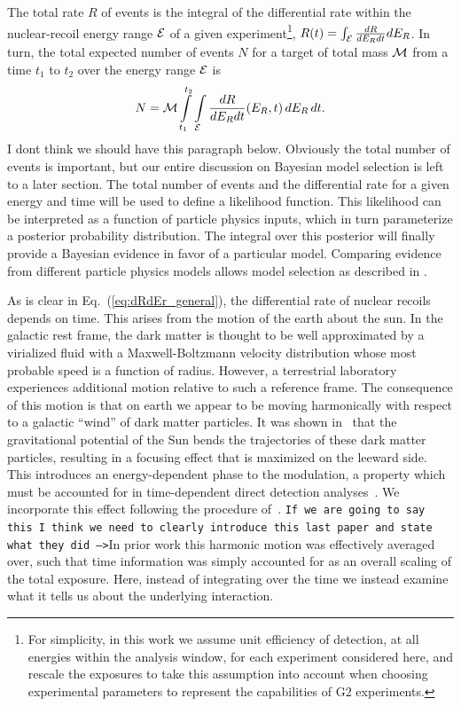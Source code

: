 \documentclass[11pt]{article}
\newcommand{\beq}{\begin{equation}} \newcommand{\eeq}{\end{equation}}
\newcommand{\Eq}[1]{Eq.~(\ref{#1})} \newcommand{\Eqs}[2]{Eqs.~(\ref{#1}) and (\ref{#2})} \newcommand{\Eqm}[2]{Eqs.~(\ref{#1}) through (\ref{#2})}
\newcommand{\sjwColor}{red}
\newcommand{\sjw}[1]{{\color{\sjwColor} #1}}
\newcommand{\sjwtt}[1]{{\color{\sjwColor}\tt #1}}
\begin{document}
The total rate $R$ of events is the integral of the differential rate within the nuclear-recoil energy range ${\cal E}$ of a given experiment\footnote{For simplicity, in this work we assume unit efficiency of detection, at all energies within the analysis window, for each experiment considered here, and rescale the exposures to take this assumption into account when choosing experimental parameters to represent the capabilities of G2 experiments.}, $R(t)=\int_{\cal E} \frac{dR}{dE_R dt} dE_R$. In turn, the total expected number of events $N$ for a target of total mass ${\cal M}$ from a time $t_1$ to $t_2$ over the energy range ${\cal E}$ is
\beq
N =  \cM \int\limits_{t_1}^{t_2} \int\limits_\cE  \frac{dR}{dE_R dt}(E_R,t)\,dE_R \,dt.
\eeq
\sjw{I dont think  we should have this paragraph below. Obviously the total number of events is important, but our entire discussion on Bayesian model selection is left to a later section. }The total number of events and the differential rate for a given energy and time will be used to define a likelihood function. This likelihood can be interpreted as a function of particle physics inputs, which in turn parameterize a posterior probability distribution. The integral over this posterior will finally provide a Bayesian evidence in favor of a particular model. Comparing evidence from different particle physics models allows model selection as described in \cite{Gluscevic:2014vga, Gluscevic:2015sqa}.

As is clear in \Eq{eq:dRdEr_general}, the differential rate of nuclear recoils depends on time. This arises from the motion of the earth about the sun. In the galactic rest frame, the dark matter is thought to be well approximated by a virialized fluid with a Maxwell-Boltzmann velocity distribution whose most probable speed is a function of radius. However, a terrestrial laboratory experiences additional motion relative to such a reference frame. The consequence of this motion is that on earth we appear to be moving harmonically with respect to a galactic ``wind'' of dark matter particles. It was shown in~\cite{Alenazi:2006wu} that the gravitational potential of the Sun bends the trajectories of these dark matter particles, resulting in a focusing effect that is maximized on the leeward side. This introduces an energy-dependent phase to the modulation, a property which must be accounted for in time-dependent direct detection analyses~\cite{Lee:2013wza,Bozorgnia:2014dqa,DelNobile:2015nua}. We incorporate this effect following the procedure of~\cite{Lee:2013wza}. \sjwtt{If we are going to say this I think we need to clearly introduce this last paper and state what they did --->}In prior work this harmonic motion was effectively averaged over, such that time information was simply accounted for as an overall scaling of the total exposure. Here, instead of integrating over the time we instead examine what it tells us about the underlying interaction.
\end{document}
